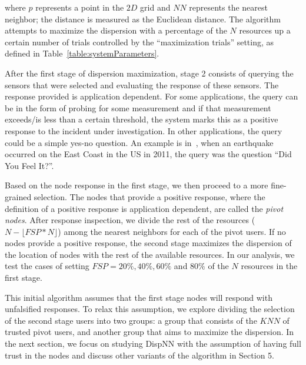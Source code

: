 \documentclass{acm_proc_article-sp}
\newcommand\floor[1]{\lfloor#1\rfloor}
\begin{document}
where $p$ represents a point in the $2D$ grid and $NN$ represents the nearest neighbor; the distance is measured as the Euclidean distance. The algorithm attempts to maximize the dispersion with a percentage of the $N$ resources up a certain number of trials controlled by the ``maximization trials'' setting, as defined in Table~\ref{table:systemParameters}. \par
After the first stage of dispersion maximization, stage 2 consists of querying the sensors that were selected and evaluating the response of these sensors. The response provided is application dependent. For some applications, the query can be in the form of probing for some measurement and if that measurement exceeds/is less than a certain threshold, the system marks this as a positive response to the incident under investigation. In other applications, the query could be a simple yes-no question. An example is in~\cite{crooks2013earthquake}, when an earthquake occurred on the East Coast in the US in 2011, the query was the question ``Did You Feel It?''.\par

Based on the node response in the first stage, we then proceed to a more fine-grained selection. The nodes that provide a positive response, where the definition of a positive response is application dependent, are called the \textit{pivot nodes}. After response inspection, we divide the rest of the resources ($N-\floor{FSP*N}$) among the nearest neighbors for each of the pivot users. If no nodes provide a positive response, the second stage maximizes the dispersion of the location of nodes with the rest of the available resources. In our analysis, we test the cases of setting $FSP = 20\%, 40\%, 60\%$ and $80\%$ of the $N$ resources in the first stage. \par

This initial algorithm assumes that the first stage nodes will respond with unfalsified responses. To relax this assumption, we explore dividing the selection of the second stage users into two groups: a group that consists of the $KNN$ of trusted pivot users, and another group that aims to maximize the dispersion. In the next section, we focus on studying DispNN with the assumption of having full trust in the nodes and discuss other variants of the algorithm in Section 5.\par
\end{document}
